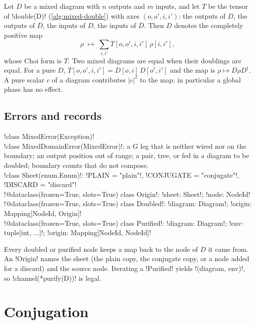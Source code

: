 \begin{definition}\label{def:mixed-meaning}
Let $D$ be a mixed diagram with $n$ outputs and $m$ inputs, and let $T$ be the tensor of \py!double(D)! (\cref{alg:mixed-double}) with axes $(o,o',i,i')$: the outputs of $D$, the outputs of $\overline D$, the inputs of $D$, the inputs of $\overline D$. Then $D$ denotes the completely positive map
\[
\rho\;\longmapsto\;\sum_{i,i'} T[o,o',i,i']\,\rho[i,i'],
\]
whose Choi form is $T$. Two mixed diagrams are equal when their doublings are equal. For a pure $D$, $T[o,o',i,i']=D[o,i]\,\overline{D[o',i']}$ and the map is $\rho\mapsto D\rho D^\dagger$. A pure scalar $c$ of a diagram contributes $|c|^2$ to the map; in particular a global phase has no effect.
\end{definition}

\subsection{Errors and records}

\begin{signature}
\py!class MixedError(Exception)!\\
\py!class MixedDomainError(MixedError)!: a G leg that is neither wired nor on the boundary; an output position out of range; a pair, tree, or fed \bbox{} in a diagram to be doubled; boundary counts that do not compose.\\
\py!class Sheet(enum.Enum)!: \py!PLAIN = "plain"!, \py!CONJUGATE = "conjugate"!, \py!DISCARD = "discard"!\\
\py!@dataclass(frozen=True, slots=True) class Origin!: \py!sheet: Sheet!; \py!node: NodeId!\\
\py!@dataclass(frozen=True, slots=True) class Doubled!: \py!diagram: Diagram!; \py!origin: Mapping[NodeId, Origin]!\\
\py!@dataclass(frozen=True, slots=True) class Purified!: \py!diagram: Diagram!; \py!env: tuple[int, ...]!; \py!origin: Mapping[NodeId, NodeId]!
\end{signature}

Every doubled or purified node keeps a map back to the node of $D$ it came from. An \py!Origin! names the sheet (the plain copy, the conjugate copy, or a node added for a discard) and the source node. Iterating a \py!Purified! yields \py!(diagram, env)!, so \py!channel(*purify(D))! is legal.

\section{Conjugation}\label{sec:mixed-conj}


